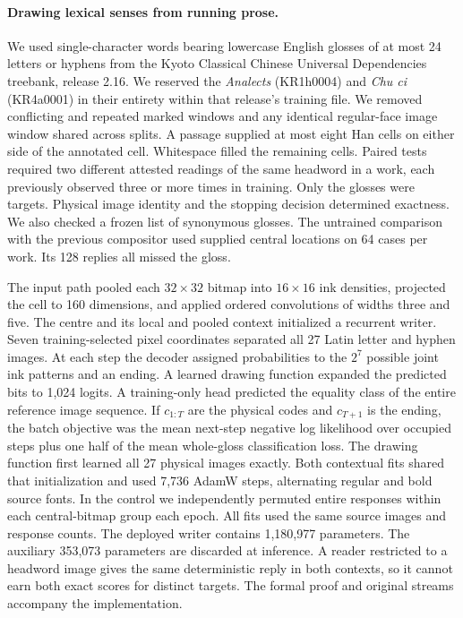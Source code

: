 \paragraph{Drawing lexical senses from running prose.}
We used single-character words bearing lowercase English glosses of at most 24 letters or hyphens from the Kyoto Classical Chinese Universal Dependencies treebank, release 2.16. We reserved the \textit{Analects} (KR1h0004) and \textit{Chu ci} (KR4a0001) in their entirety within that release's training file. We removed conflicting and repeated marked windows and any identical regular-face image window shared across splits. A passage supplied at most eight Han cells on either side of the annotated cell. Whitespace filled the remaining cells. Paired tests required two different attested readings of the same headword in a work, each previously observed three or more times in training. Only the glosses were targets. Physical image identity and the stopping decision determined exactness. We also checked a frozen list of synonymous glosses. The untrained comparison with the previous compositor used supplied central locations on 64 cases per work. Its 128 replies all missed the gloss.

The input path pooled each $32\times32$ bitmap into $16\times16$ ink densities, projected the cell to 160 dimensions, and applied ordered convolutions of widths three and five. The centre and its local and pooled context initialized a recurrent writer. Seven training-selected pixel coordinates separated all 27 Latin letter and hyphen images. At each step the decoder assigned probabilities to the $2^7$ possible joint ink patterns and an ending. A learned drawing function expanded the predicted bits to 1,024 logits. A training-only head predicted the equality class of the entire reference image sequence. If $c_{1:T}$ are the physical codes and $c_{T+1}$ is the ending, the batch objective was the mean next-step negative log likelihood over occupied steps plus one half of the mean whole-gloss classification loss. The drawing function first learned all 27 physical images exactly. Both contextual fits shared that initialization and used 7,736 AdamW steps, alternating regular and bold source fonts. In the control we independently permuted entire responses within each central-bitmap group each epoch. All fits used the same source images and response counts. The deployed writer contains 1,180,977 parameters. The auxiliary 353,073 parameters are discarded at inference. A reader restricted to a headword image gives the same deterministic reply in both contexts, so it cannot earn both exact scores for distinct targets. The formal proof and original streams accompany the implementation.

